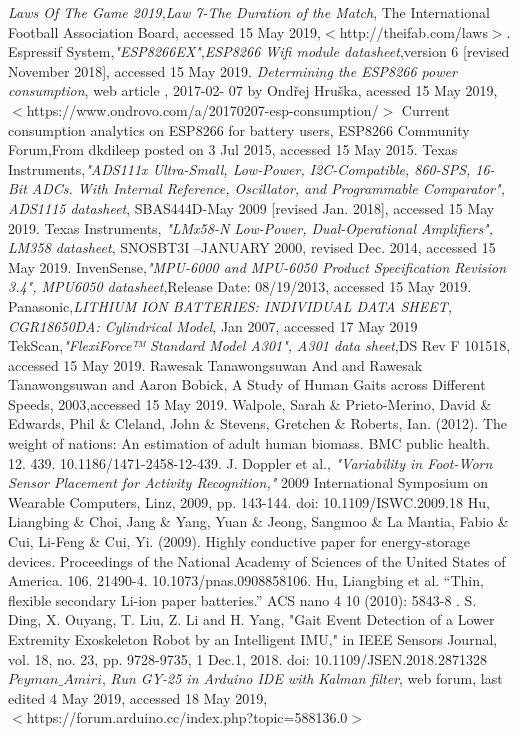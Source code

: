 \documentclass[12pt,a4paper]{article}
\begin{document}
\begin{thebibliography}{991}
\textit{Laws Of The Game 2019,Law 7-The Duration of the Match}, The International Football Association Board, accessed 15 May 2019,$<$http://theifab.com/laws$>$.
Espressif System,\textit{"ESP8266EX"},\textit{ESP8266 Wifi module datasheet},version 6 [revised November 2018], accessed 15 May 2019.
\textit{Determining the ESP8266 power consumption}, web article , 2017-02-	07 by Ondřej Hruška, acessed 15 May 2019, $<$https://www.ondrovo.com/a/20170207-esp-consumption/$>$
Current consumption analytics on ESP8266 for battery users, ESP8266 Community Forum,From dkdileep posted on 3 Jul 2015, accessed 15 May 2015.
Texas Instruments,\textit{"ADS111x Ultra-Small, Low-Power, I2C-Compatible, 860-SPS, 16-Bit ADCs.
With Internal Reference, Oscillator, and Programmable Comparator", ADS1115 datasheet}, SBAS444D-May 2009 [revised Jan. 2018], accessed 15 May 2019.
Texas Instruments, \textit{"LMx58-N Low-Power, Dual-Operational Amplifiers", LM358 datasheet}, SNOSBT3I –JANUARY 2000, revised Dec. 2014, accessed 15 May 2019.
InvenSense,\textit{"MPU-6000 and MPU-6050 Product Specification Revision 3.4", MPU6050 datasheet},Release Date: 08/19/2013, accessed 15 May 2019.
Panasonic,\textit{LITHIUM ION BATTERIES: INDIVIDUAL DATA SHEET, CGR18650DA: Cylindrical Model}, Jan 2007, accessed 17 May 2019
TekScan,\textit{"FlexiForce™ Standard Model A301", A301 data sheet},DS Rev F 101518, accessed 15 May 2019.
Rawesak Tanawongsuwan And and Rawesak Tanawongsuwan and Aaron Bobick, A Study of Human Gaits across Different Speeds, 2003,accessed 15 May 2019.
Walpole, Sarah \& Prieto-Merino, David \& Edwards, Phil \& Cleland, John \& Stevens, Gretchen \& Roberts, Ian. (2012). The weight of nations: An estimation of adult human biomass. BMC public health. 12. 439. 10.1186/1471-2458-12-439. 
J. Doppler et al., \textit{"Variability in Foot-Worn Sensor Placement for Activity Recognition,"} 2009 International Symposium on Wearable Computers, Linz, 2009, pp. 143-144.
doi: 10.1109/ISWC.2009.18
Hu, Liangbing \& Choi, Jang \& Yang, Yuan \& Jeong, Sangmoo \& La Mantia, Fabio \& Cui, Li-Feng \& Cui, Yi. (2009). Highly conductive paper for energy-storage devices. Proceedings of the National Academy of Sciences of the United States of America. 106. 21490-4. 10.1073/pnas.0908858106. 
Hu, Liangbing et al. “Thin, flexible secondary Li-ion paper batteries.” ACS nano 4 10 (2010): 5843-8 .
S. Ding, X. Ouyang, T. Liu, Z. Li and H. Yang, "Gait Event Detection of a Lower Extremity Exoskeleton Robot by an Intelligent IMU," in IEEE Sensors Journal, vol. 18, no. 23, pp. 9728-9735, 1 Dec.1, 2018.
doi: 10.1109/JSEN.2018.2871328
$Peyman\_Amiri$, \textit{Run GY-25 in Arduino IDE with Kalman filter}, web forum, last edited 4 May 2019, accessed 18 May 2019,\\
$<$https://forum.arduino.cc/index.php?topic=588136.0$>$ 
\end{thebibliography}
\end{document}
